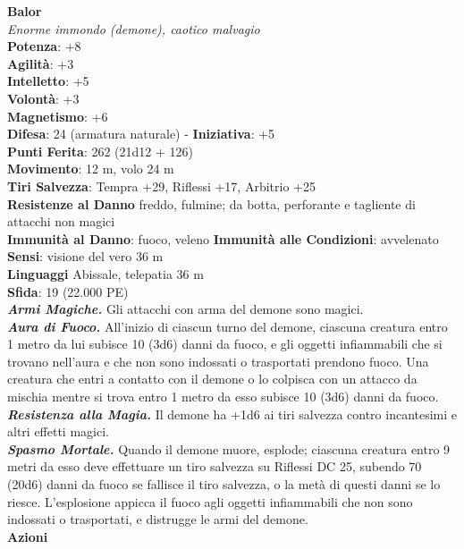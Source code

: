 \begin{multicols}{2}
\medskip\textbf{Balor}\\
\emph{Enorme immondo (demone), caotico malvagio}\\
\textbf{Potenza}: +8\\
\textbf{Agilità}: +3\\
\textbf{Intelletto}: +5\\
\textbf{Volontà}: +3\\
\textbf{Magnetismo}: +6\\
\textbf{Difesa}: 24 (armatura naturale) - \textbf{Iniziativa}: +5\\
\textbf{Punti Ferita}: 262 (21d12 + 126)\\
\textbf{Movimento}: 12 m, volo 24 m\\
\textbf{Tiri Salvezza}: Tempra +29, Riflessi +17, Arbitrio +25\\
\textbf{Resistenze al Danno} freddo, fulmine; da botta, perforante e tagliente di attacchi non magici\\ 
\textbf{Immunità al Danno}: fuoco, veleno \textbf{Immunità alle Condizioni}: avvelenato\\
\textbf{Sensi}: visione del vero 36 m\\
\textbf{Linguaggi} Abissale, telepatia 36 m\\
\textbf{Sfida}: 19 (22.000 PE)\smallskip\\
\emph{\textbf{Armi Magiche.}} Gli attacchi con arma del demone sono magici.\\
\emph{\textbf{Aura di Fuoco.}} All'inizio di ciascun turno del demone, ciascuna creatura entro 1 metro da lui subisce 10 (3d6) danni da fuoco, e gli oggetti infiammabili che si trovano nell'aura e che non sono indossati o trasportati prendono fuoco. Una creatura che entri a contatto con il demone o lo colpisca con un attacco da mischia mentre si trova entro 1 metro da esso subisce 10 (3d6) danni da fuoco.\\
\emph{\textbf{Resistenza alla Magia.}} Il demone ha +1d6 ai tiri salvezza contro incantesimi e altri effetti magici.\\
\emph{\textbf{Spasmo Mortale.}} Quando il demone muore, esplode; ciascuna creatura entro 9 metri da esso deve effettuare un tiro salvezza su Riflessi DC  25, subendo 70 (20d6) danni da fuoco se fallisce il tiro salvezza, o la metà di questi danni se lo riesce. L'esplosione appicca il fuoco agli oggetti infiammabili che non sono indossati o trasportati, e distrugge le armi del demone. \\
\smallskip\textbf{Azioni}\\

\end{multicols}
